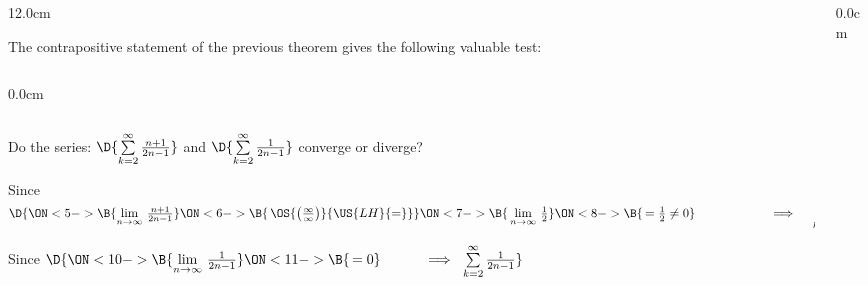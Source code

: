 \begin{frame}
\scriptsize
\begin{columns}
\begin{column}{12.0cm}

The contrapositive statement of the previous theorem gives the following valuable test:

\vspace{0.6cm}

\begin{columns}\begin{column}{0.0cm}\end{column}\end{columns}

\vspace{0.7cm}

\EX Do the series:  $\D{\sum \limits_{k=2}^{\infty} \frac{n+1}{2n-1}}$ \quad and \quad $\D{\sum \limits_{k=2}^{\infty} \frac{1}{2n-1}}$ converge or diverge?

\vspace{0.7cm}

Since \quad $\D{
\ON<5->{\B{\lim \limits_{n \to \infty}\,\frac{n+1}{2n-1}}}
\ON<6->{\B{\,\OS{\left(\frac{\infty}{\infty}\right)}{\US{LH}{=}}}}
\ON<7->{\B{\,\lim \limits_{n \to \infty}\,\frac{1}{2}}}
\ON<8->{\B{\, = \frac{1}{2} \ne 0}} \hspace{2.0cm} 
\implies \quad \sum \limits_{k=2}^{\infty} \frac{n+1}{2n-1}}$ 

\vspace{0.7cm}

Since \quad $\D{
\ON<10->{\B{\lim \limits_{n \to \infty}\,\frac{1}{2n-1}}}
\ON<11->{\B{\, = 0}} \hspace{1.0cm} 
\implies \,\, 
\sum \limits_{k=2}^{\infty} \frac{1}{2n-1}}$ 

\vspace{1.2cm}

\end{column}
\begin{column}{0.0cm}\end{column}
\end{columns}
\end{frame}

